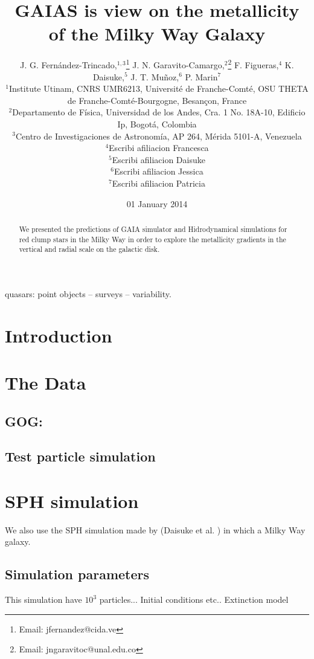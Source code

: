 \documentclass[useAMS,usenatbib]{mn2e}
\title[]{GAIAS is view on the metallicity of the Milky Way Galaxy}
\author[J. G. Fern\'andez-Trincado and J. N. Garavito-Camargo]{
J. G. Fern\'andez-Trincado,$^{1,3}$\thanks{Email: jfernandez@cida.ve}
J. N. Garavito-Camargo,$^{2}$\thanks{Email: jngaravitoc@unal.edu.co}
F. Figueras,$^{4}$
K. Daisuke,$^{5}$ 
\newauthor
J. T. Mu\~noz,$^{6}$   
P. Marin$^{7}$
\\
$^{1}$Institute Utinam, CNRS UMR6213, Universit\'e de Franche-Comt\'e, OSU THETA de Franche-Comt\'e-Bourgogne, Besan\c{c}on, France\\
$^{2}$Departamento de F\'{i}sica, Universidad de los Andes, Cra. 1 No. 18A-10, Edificio Ip, Bogot\'a, Colombia\\
$^{3}$Centro de Investigaciones de Astronom\'ia, AP 264, M\'erida 5101-A, Venezuela\\
$^{4}$Escribi afiliacion Francesca\\
$^{5}$Escribi afiliacion Daisuke\\
$^{6}$Escribi afiliacion Jessica\\
$^{7}$Escribi afiliacion Patricia\\
}
\begin{document}
\date{01 January 2014}

\pagerange{\pageref{firstpage}--\pageref{lastpage}} 

\maketitle

\label{firstpage}

\begin{abstract}

We presented the predictions of GAIA simulator and Hidrodynamical simulations
for red clump stars in the Milky Way in order to explore the metallicity gradients in the vertical and radial scale on the 
galactic disk.
\end{abstract}

\begin{keywords}
quasars: point objects -- surveys -- variability.
\end{keywords}

\section{Introduction}


\section{The Data}

\subsection{GOG: }

\subsection{Test particle simulation}

\section{SPH simulation}

We also use the SPH simulation made by (Daisuke et al. ) in 
which a Milky Way galaxy. 

\subsection{Simulation parameters}


This simulation have $10^3$ particles... Initial conditions etc.. Extinction model 
\end{document}
